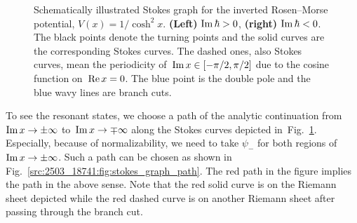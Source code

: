\begin{figure}[t]
\caption{Schematically illustrated Stokes graph for the inverted Rosen--Morse potential, $V(x)=1/\cosh^2x$.
\textbf{(Left)} $\operatorname{Im}\hbar>0$, \textbf{(right)} $\operatorname{Im}\hbar<0$.
The black points denote the turning points and the solid curves are the corresponding Stokes curves.
The dashed ones, also Stokes curves, mean the periodicity of~$\operatorname{Im} x\in[-\pi/2,\pi/2]$ due to the cosine function on~$\operatorname{Re} x=0$.
The blue point is the double pole and the blue wavy lines are branch cuts.}
\label{src:2503_18741:fig:stokes_graph}
\end{figure}
To see the resonant states, we choose a path of the analytic continuation from~$\operatorname{Im} x\to\pm\infty$ to~$\operatorname{Im} x\to\mp\infty$ along the Stokes curves depicted in~Fig.~\ref{src:2503_18741:fig:stokes_graph}.
Especially, because of normalizability,
we need to take $\psi_-$ for both regions of~$\operatorname{Im} x\to\pm\infty$.
Such a path can be chosen as shown in Fig.~\ref{src:2503_18741:fig:stokes_graph_path}.
The red path in the figure implies the path in the above sense.
Note that the red solid curve is on the Riemann sheet depicted
while the red dashed curve is on another Riemann sheet after passing through the branch cut.
